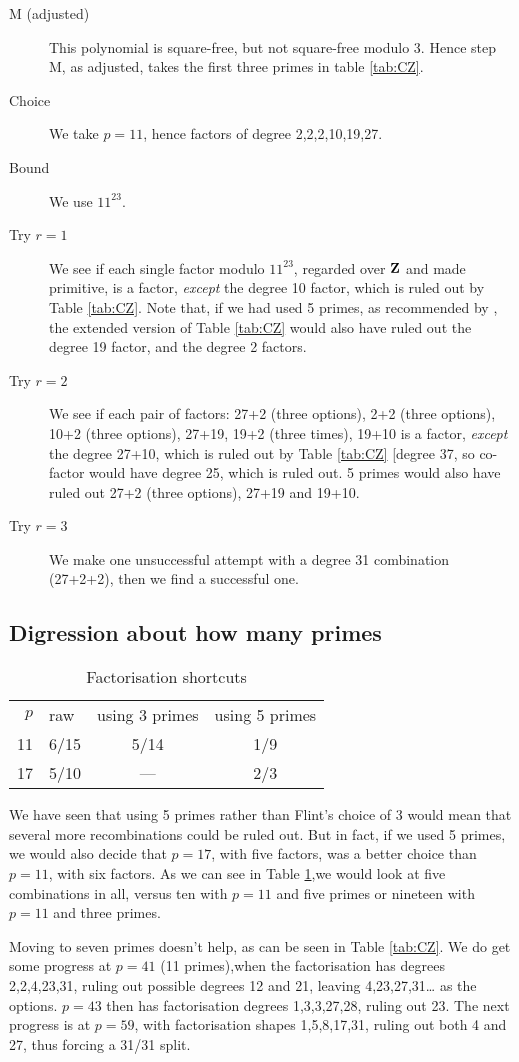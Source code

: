 \documentclass{llncs}
\begin{document}
\begin{description}
\item[M (adjusted)]
This polynomial is square-free, but not square-free modulo 3. Hence step M, as adjusted, takes the first three primes in table \ref{tab:CZ}.
\item[Choice]We take $p=11$, hence factors of degree 2,2,2,10,19,27. 
\item[Bound]We use $11^{23}$.  
\item[Try $r=1$]We see if each single factor modulo $11^{23}$, regarded over ${\bf Z}$ and made primitive, is a factor, \emph{except} the degree 10 factor, which is ruled out by Table \ref{tab:CZ}. Note that, if we had used 5 primes, as recommended by \cite{Musser1975a}, the extended version of Table \ref{tab:CZ} would also have ruled out the degree 19 factor, and the degree 2 factors.
\item[Try $r=2$]We see if each pair of factors: 27+2 (three options), 2+2 (three options), 10+2 (three options), 27+19, 19+2 (three times), 19+10 is a factor, \emph{except} the degree 27+10, which is ruled out by Table \ref{tab:CZ} [degree 37, so co-factor would have degree 25, which is ruled out. 5 primes would also have ruled out 27+2 (three options), 27+19 and 19+10.
\item[Try $r=3$]We make one unsuccessful attempt with a degree 31 combination (27+2+2), then we find a successful one.
\end{description}
\subsection{Digression about how many primes}
\begin{table}
\caption{Factorisation shortcuts\label{tab:shortcut}}
\begin{tabular}{rlcc}
$p$&raw&using 3 primes&using 5 primes\\
11&6/15&5/14&1/9\\
17&5/10&---&2/3\\
\end{tabular}
\end{table}
We have seen that using 5 primes rather than Flint's choice of 3 would mean that several more recombinations could be ruled out.  But in fact, if we used 5 primes, we would also decide that $p=17$, with five factors, was a better choice than $p=11$, with six factors. As we can see in Table \ref{tab:shortcut},we would look at five combinations in all, versus ten with $p=11$ and five primes or nineteen with $p=11$ and three primes.
\par
Moving to seven primes doesn't help, as can be seen in Table \ref{tab:CZ}. We do get some progress at $p=41$ (11 primes),when the factorisation has degrees 2,2,4,23,31, ruling out possible degrees 12 and 21, leaving 4,23,27,31\dots{} as the options. $p=43$ then has factorisation degrees 1,3,3,27,28, ruling out 23. The next progress is at $p=59$, with factorisation shapes 1,5,8,17,31, ruling out both 4 and 27, thus forcing a 31/31 split.
\end{document}
